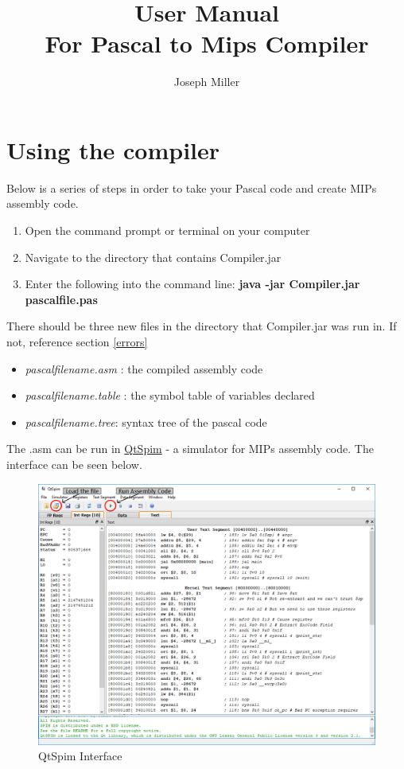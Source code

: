 \documentclass[english]{article}
\begin{document}
\title{ User Manual \\
	\large For Pascal to Mips Compiler}
\author{Joseph Miller}
\maketitle

\section{Using the compiler} \label{using}

Below is a series of steps in order to take your Pascal code and create MIPs assembly code.

\begin{enumerate}
   \item Open the command prompt or terminal on your computer
   \item Navigate to the directory that contains Compiler.jar
   \item Enter the following into the command line: \textbf{java -jar Compiler.jar pascalfile.pas}
\end{enumerate}

\noindent There should be three new files in the directory that Compiler.jar was run in. If not, reference section \ref{errors}

\begin{itemize}
   \item  \textit{pascalfilename.asm} : the compiled assembly code
   \item  \textit{pascalfilename.table} : the symbol table of variables declared
   \item  \textit{pascalfilename.tree}: syntax tree of the pascal code
\end{itemize}

\noindent The .asm can be run in \href{http://spimsimulator.sourceforge.net/}{QtSpim} - a simulator for MIPs assembly code. The interface can be seen below.

\begin{figure}[H]
\begin{center}
\includegraphics[width=.8\textwidth]{qtspim.PNG}
\end{center}
\caption{\label{QtSpim}QtSpim Interface}
\end{figure}
\end{document}
